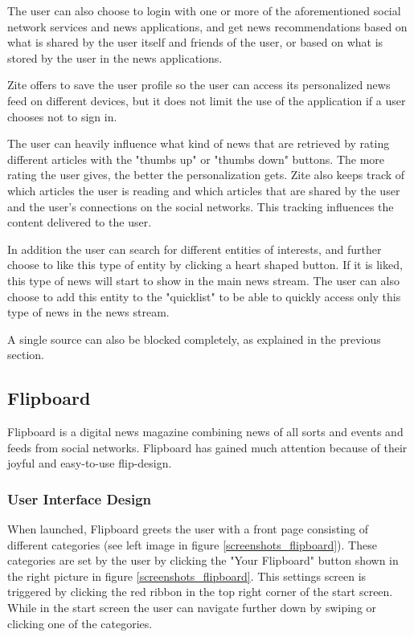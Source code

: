 The user can also choose to login with one or more of the aforementioned social network services and news applications, and get news recommendations based on what is shared by the user itself and friends of the user, or based on what is stored by the user in the news applications. 

Zite offers to save the user profile so the user can access its personalized news feed on different devices, but it does not limit the use of the application if a user chooses not to sign in.

The user can heavily influence what kind of news that are retrieved by rating different articles with the "thumbs up" or "thumbs down" buttons. The more rating the user gives, the better the personalization gets. Zite also keeps track of which articles the user is reading and which articles that are shared by the user and the user's connections on the social networks. This tracking influences the content delivered to the user.

In addition the user can search for different entities of interests, and further choose to like this type of entity by clicking a heart shaped button. If it is liked, this type of news will start to show in the main news stream. The user can also choose to add this entity to the "quicklist" to be able to quickly access only this type of news in the news stream.

A single source can also be blocked completely, as explained in the previous section.



\subsection{Flipboard}
Flipboard is a digital news magazine combining news of all sorts and events and feeds from social networks. Flipboard has gained much attention because of their joyful and easy-to-use flip-design.

\subsubsection{User Interface Design}
When launched, Flipboard greets the user with a front page consisting of different categories (see left image in figure \ref{screenshots_flipboard}). These categories are set by the user by clicking the "Your Flipboard" button shown in the right picture in figure \ref{screenshots_flipboard}. This settings screen is triggered by clicking the red ribbon in the top right corner of the start screen. While in the start screen the user can navigate further down by swiping or clicking one of the categories.

